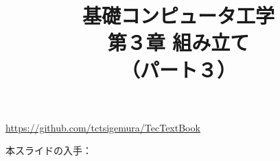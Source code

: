 \documentclass[handout]{beamer}        %
\begin{document}
\title{基礎コンピュータ工学\\第３章 組み立て\\（パート３）}
\date{}

\begin{frame}
  \titlepage
  \centerline{\url{https://github.com/tctsigemura/TecTextBook}}
  \vfill
  \centerline{本スライドの入手：
    }
\end{frame}

\end{document}
